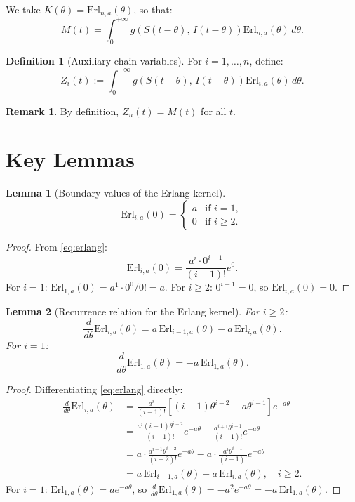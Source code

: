 \documentclass[12pt,a4paper]{article}
\newtheorem{lemma}{Lemma}
\theoremstyle{definition}
\newtheorem{definition}{Definition}
\newtheorem{remark}{Remark}
\begin{document}
We take $K(\theta) = \mathrm{Erl}_{n,a}(\theta)$, so that:
\[
    M(t) = \int_0^{+\infty} g\!\left(S(t-\theta),\, I(t-\theta)\right) \mathrm{Erl}_{n,a}(\theta)\, d\theta.
\]

\begin{definition}[Auxiliary chain variables]
For $i = 1, \ldots, n$, define:
\begin{equation}
    Z_i(t) := \int_0^{+\infty} g\!\left(S(t-\theta),\, I(t-\theta)\right) \mathrm{Erl}_{i,a}(\theta)\, d\theta.
    \label{eq:Zi}
\end{equation}
\end{definition}

\begin{remark}
By definition, $Z_n(t) = M(t)$ for all $t$.
\end{remark}

\section{Key Lemmas}

\begin{lemma}[Boundary values of the Erlang kernel]
\label{lem:boundary}
\[
    \mathrm{Erl}_{i,a}(0) =
    \begin{cases}
        a & \text{if } i = 1, \\
        0 & \text{if } i \geq 2.
    \end{cases}
\]
\end{lemma}

\begin{proof}
From \eqref{eq:erlang}:
\[
    \mathrm{Erl}_{i,a}(0) = \frac{a^i \cdot 0^{i-1}}{(i-1)!} e^0.
\]
For $i = 1$: $\mathrm{Erl}_{1,a}(0) = a^1 \cdot 0^0 / 0! = a$.
For $i \geq 2$: $0^{i-1} = 0$, so $\mathrm{Erl}_{i,a}(0) = 0$.
\end{proof}

\begin{lemma}[Recurrence relation for the Erlang kernel]
\label{lem:recurrence}
For $i \geq 2$:
\[
    \frac{d}{d\theta}\mathrm{Erl}_{i,a}(\theta) = a\,\mathrm{Erl}_{i-1,a}(\theta) - a\,\mathrm{Erl}_{i,a}(\theta).
\]
For $i = 1$:
\[
    \frac{d}{d\theta}\mathrm{Erl}_{1,a}(\theta) = -a\,\mathrm{Erl}_{1,a}(\theta).
\]
\end{lemma}

\begin{proof}
Differentiating \eqref{eq:erlang} directly:
\begin{align*}
    \frac{d}{d\theta}\mathrm{Erl}_{i,a}(\theta)
    &= \frac{a^i}{(i-1)!}\left[(i-1)\theta^{i-2} - a\theta^{i-1}\right]e^{-a\theta} \\
    &= \frac{a^i(i-1)\theta^{i-2}}{(i-1)!}e^{-a\theta} - \frac{a^{i+1}\theta^{i-1}}{(i-1)!}e^{-a\theta} \\
    &= a\cdot\frac{a^{i-1}\theta^{i-2}}{(i-2)!}e^{-a\theta} - a\cdot\frac{a^i\theta^{i-1}}{(i-1)!}e^{-a\theta} \\
    &= a\,\mathrm{Erl}_{i-1,a}(\theta) - a\,\mathrm{Erl}_{i,a}(\theta), \quad i \geq 2.
\end{align*}
For $i=1$: $\mathrm{Erl}_{1,a}(\theta) = ae^{-a\theta}$, so $\frac{d}{d\theta}\mathrm{Erl}_{1,a}(\theta) = -a^2 e^{-a\theta} = -a\,\mathrm{Erl}_{1,a}(\theta)$.
\end{proof}
\end{document}
